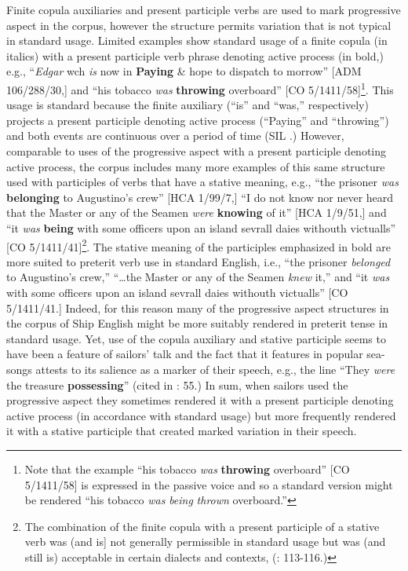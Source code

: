 Finite copula auxiliaries and present participle verbs are used to mark progressive aspect in the corpus, however the structure permits variation that is not typical in standard usage. Limited examples show standard usage of a finite copula (in italics) with a present participle verb phrase denoting active process (in bold,) e.g., “\textit{Edgar} wch \textit{is} now in \textbf{Paying} \& hope to dispatch to morrow” [ADM 106/288/30,] and “his tobacco \textit{was} \textbf{throwing} overboard” [CO 5/1411/58]\footnote{Note that the example “his tobacco \textit{was} \textbf{throwing} overboard” [CO 5/1411/58] is expressed in the passive voice and so a standard version might be rendered “his tobacco \textit{was} \textit{being} \textit{thrown} overboard.”}. This usage is standard because the finite auxiliary (“is” and “was,” respectively) projects a present participle denoting active process (“Paying” and “throwing”) and both events are continuous over a period of time (SIL \citealt{International2005}.) However, comparable to uses of the progressive aspect with a present participle denoting active process, the corpus includes many more examples of this same structure used with participles of verbs that have a stative meaning, e.g., “the prisoner \textit{was} \textbf{belonging} to Augustino’s crew” [HCA 1/99/7,] “I do not know nor never heard that the Master or any of the Seamen \textit{were} \textbf{knowing} of it” [HCA 1/9/51,] and “it \textit{was} \textbf{being} with some officers upon an island sevrall daies withouth victualls” [CO 5/1411/41]\footnote{The combination of the finite copula with a present participle of a stative verb was (and is] not generally permissible in standard usage but was (and still is) acceptable in certain dialects and contexts, (\citealt{Romer2005}: 113-116.)}. The stative meaning of the participles emphasized in bold are more suited to preterit verb use in standard English, i.e., “the prisoner \textit{belonged} to Augustino’s crew,” “…the Master or any of the Seamen \textit{knew} it,” and “it \textit{was} with some officers upon an island sevrall daies withouth victualls” [CO 5/1411/41.] Indeed, for this reason many of the progressive aspect structures in the corpus of Ship English might be more suitably rendered in preterit tense in standard usage. Yet, use of the copula auxiliary and stative participle seems to have been a feature of sailors’ talk and the fact that it features in popular sea-songs attests to its salience as a marker of their speech, e.g., the line “They \textit{were} the treasure \textbf{possessing}” (cited in \citealt{Palmer1986}: 55.) In sum, when sailors used the progressive aspect they sometimes rendered it with a present participle denoting active process (in accordance with standard usage) but more frequently rendered it with a stative participle that created marked variation in their speech. 

